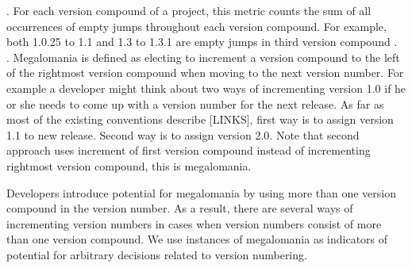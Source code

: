 \documentclass[conference]{IEEEtran}
\begin{document}

. For each version compound of a project, this metric counts the sum of all occurrences of empty jumps throughout each version compound.
For example, both 1.0.25 to 1.1 and 1.3 to 1.3.1 are empty jumps in third version compound . \\

%

 
. Megalomania is defined as electing to increment a version compound to the left of the rightmost version compound when moving to the next version number.
For example a developer might think about two ways of incrementing version 1.0 if he or she needs to come up with a version number for the next release.
 As far as most of the existing conventions describe [LINKS], first way is to assign version 1.1 to new release. Second way is to assign version 2.0. Note that second approach uses increment of first version compound instead of incrementing rightmost version compound, this is megalomania. 

Developers introduce potential for megalomania by using more than one version compound in the version number. As a result, there are several ways of incrementing version numbers in cases when version numbers consist of more than one version compound. We use instances of megalomania as indicators of potential for arbitrary decisions related to version numbering. 
\end{document}
